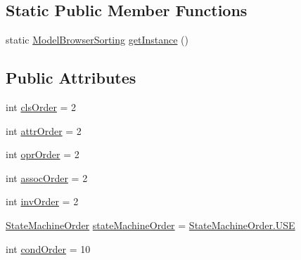 \subsection*{Static Public Member Functions}
\begin{DoxyCompactItemize}
\item 
static \hyperlink{classorg_1_1tzi_1_1use_1_1gui_1_1main_1_1_model_browser_sorting}{Model\-Browser\-Sorting} \hyperlink{classorg_1_1tzi_1_1use_1_1gui_1_1main_1_1_model_browser_sorting_a7351968ae32ae9abcd81e2564e7c224c}{get\-Instance} ()
\end{DoxyCompactItemize}
\subsection*{Public Attributes}
\begin{DoxyCompactItemize}
\item 
int \hyperlink{classorg_1_1tzi_1_1use_1_1gui_1_1main_1_1_model_browser_sorting_af76aca5fe183a910c57bf7e94290cb2a}{cls\-Order} = 2
\item 
int \hyperlink{classorg_1_1tzi_1_1use_1_1gui_1_1main_1_1_model_browser_sorting_a34fecb61c83c05589692fee4edf699d0}{attr\-Order} = 2
\item 
int \hyperlink{classorg_1_1tzi_1_1use_1_1gui_1_1main_1_1_model_browser_sorting_a720b167ed811a7277888f1f025d058a9}{opr\-Order} = 2
\item 
int \hyperlink{classorg_1_1tzi_1_1use_1_1gui_1_1main_1_1_model_browser_sorting_abefd9438645b6fe3a7638dcd9cf2ce7f}{assoc\-Order} = 2
\item 
int \hyperlink{classorg_1_1tzi_1_1use_1_1gui_1_1main_1_1_model_browser_sorting_abc9e52c553b97504a612d008b4e85991}{inv\-Order} = 2
\item 
\hyperlink{enumorg_1_1tzi_1_1use_1_1gui_1_1main_1_1_model_browser_sorting_1_1_state_machine_order}{State\-Machine\-Order} \hyperlink{classorg_1_1tzi_1_1use_1_1gui_1_1main_1_1_model_browser_sorting_a5cad94658211aca35a3d501afc26f7c2}{state\-Machine\-Order} = \hyperlink{enumorg_1_1tzi_1_1use_1_1gui_1_1main_1_1_model_browser_sorting_1_1_state_machine_order_a179a3bec29686d676f8aaf9b2bff2f4d}{State\-Machine\-Order.\-U\-S\-E}
\item 
int \hyperlink{classorg_1_1tzi_1_1use_1_1gui_1_1main_1_1_model_browser_sorting_a66e5ecacf2e48e5e7e379c368117ae27}{cond\-Order} = 10
\end{DoxyCompactItemize}
